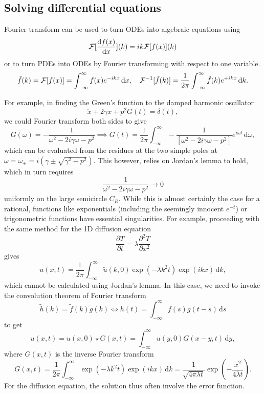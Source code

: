 \documentclass{article}
\begin{document}
\subsection{Solving differential equations}
Fourier transform can be used to turn ODEs into algebraic equations using
\[
    \mathcal{\MakeUppercase{F}} [\frac{\mathrm{d}f(x)}{\mathrm{d}x} ] (k) 
     = i k \mathcal{\MakeUppercase{F}} [f(x)](k)
\]
or to turn PDEs into ODEs by Fourier transforming with respect to one variable. 
\[
    \tilde{f}(k) = \mathcal{\MakeUppercase{F}} [f(x)] = \int_{-\infty}^{\infty} f(x)e^{-i k x} \,\mathrm{d}x, \quad 
    \mathcal{\MakeUppercase{F}}^{-1} [\tilde{f}(k)]= 
    \frac{1}{2\pi }\int_{-\infty}^{\infty} \tilde{f}(k) e^{+i k x} \,\mathrm{d}k.  
\]

For example, in finding the Green's function to the damped harmonic oscillator
\[
    \ddot{x} + 2 \gamma  \dot{x} + p^{2}  G(t) = \delta(t),
\]
we could Fourier transform both sides to give
\[
    \tilde{G(\omega )} = - \frac{1}{\omega ^{2} - 2 i \gamma  \omega - p^{2} }
    \implies  
    G(t) = \frac{1}{2\pi } \int_{-\infty}^{\infty} - \frac{1}{[\omega ^{2} - 2 i \gamma  \omega - p^{2} ]}e^{i \omega  t} \,\mathrm{d}\omega,  
\]
which can be evaluated from the residues at the two simple poles at $\omega = \omega_{\pm} = i (\gamma  \pm \sqrt{\gamma ^{2}  -p^{2} } ).$ This however, relies on Jordan's lemma to hold, which in turn requires
\[
    \frac{1}{\omega ^{2} - 2 i \gamma  \omega - p^{2} } \to 0
\]
uniformly on the large semicircle $C_R.$ While this is almost certainly the case for a rational, functions like exponentials (including the seemingly innocent $e^{-t}$) or trigonometric functions have essential singularities. 
For example, proceeding with the same method for the 1D diffusion equation 
\[
    \frac{\partial T}{\partial t} = \lambda \frac{\partial ^{2} T}{\partial x^{2} } 
\]
gives
\[
    u(x,t) = \frac{1}{2\pi  } \int_{-\infty}^{\infty} \tilde{u}(k,0) \exp (- \lambda k^{2} t) \exp (ikx) \,\mathrm{d}k,
\]
which cannot be calculated using Jordan's lemma. 
In this case, we need to invoke the convolution theorem of Fourier transform
\[
    \tilde{h}(k) = \tilde{f}(k) \tilde{g}(k) \Longleftrightarrow    h(t) = \int_{-\infty}^{\infty} f(s) g(t-s)\,\mathrm{d}s 
\]
to get
\[
    u(x,t) = u(x,0) \star G(x,t) = \int_{-\infty}^{\infty} u(y,0) G(x-y,t) \,\mathrm{d}y,
\]
where $G(x,t)$ is the inverse Fourier transform
\[
    G(x,t) = \frac{1}{2\pi } \int_{-\infty}^{\infty} \exp (-\lambda k^{2} t) \exp (ikx) \,\mathrm{d}k = \frac{1}{\sqrt{4 \pi  \lambda  t} } \exp \left( - \frac{x^{2} }{4\lambda t}\right).
\]
For the diffusion equation, the solution thus often involve the error function. 
\end{document}
